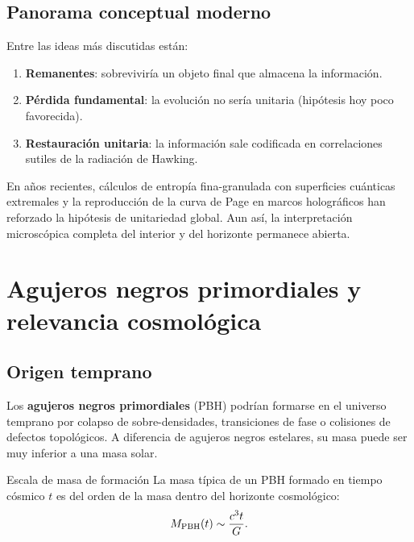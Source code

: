 \subsection{Panorama conceptual moderno}

Entre las ideas más discutidas están:
\begin{enumerate}[leftmargin=2em, label=\textbf{(\alph*)}]
  \item \textbf{Remanentes}: sobreviviría un objeto final que almacena la información.
  \item \textbf{Pérdida fundamental}: la evolución no sería unitaria (hipótesis hoy poco favorecida).
  \item \textbf{Restauración unitaria}: la información sale codificada en correlaciones sutiles de la radiación de Hawking.
\end{enumerate}

En años recientes, cálculos de entropía fina-granulada con superficies cuánticas extremales y la reproducción de la curva de Page en marcos holográficos han reforzado la hipótesis de unitariedad global. Aun así, la interpretación microscópica completa del interior y del horizonte permanece abierta.

\section{Agujeros negros primordiales y relevancia cosmológica}
\label{sec:pbh}

\subsection{Origen temprano}

Los \textbf{agujeros negros primordiales} (PBH) podrían formarse en el universo temprano por colapso de sobre-densidades, transiciones de fase o colisiones de defectos topológicos. A diferencia de agujeros negros estelares, su masa puede ser muy inferior a una masa solar.

\begin{proposicion}{Escala de masa de formación}{}
La masa típica de un PBH formado en tiempo cósmico $t$ es del orden de la masa dentro del horizonte cosmológico:
\begin{equation}
  M_{\rm PBH}(t) \sim \frac{c^3 t}{G}.
\end{equation}
\end{proposicion}

